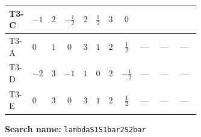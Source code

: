 \documentclass[8pt]{article}
\begin{document}
\begin{landscape}
\begin{longtable}{@{}llcccccc >{\raggedright\arraybackslash}p{0.21\linewidth} >{\raggedright\arraybackslash}p{0.21\linewidth} >{\raggedright\arraybackslash}p{0.21\linewidth}@{}}
T3-C & $-1$ & $2$ & $-\frac{1}{2}$ & $2$ & $\frac{1}{2}$ & $3$ & $0$ & \scriptsize\adjustbox{max width=\linewidth}{$\begin{gathered} 4 {\lambda_{S_1^{\dagger 2}S_2^{\dagger 2}}} (\left({\lambda_{S_1^\dagger S_2 S_2^{\dagger 2}}}\right)^{*}+5 \left({\lambda_{S_1 S_1^{\dagger 2}S_2^\dagger}}\right)^{*})\end{gathered}$} & \scriptsize\adjustbox{max width=\linewidth}{$\begin{gathered} -9 {g_2}^2 {\lambda_{S_1 S_1^{\dagger 2}S_2^\dagger}}\end{gathered}$} & \scriptsize\adjustbox{max width=\linewidth}{$\begin{gathered} -3 {g_Y}^2 {\lambda_{S_1 S_1^{\dagger 2}S_2^\dagger}}\end{gathered}$} \\
\midrule
T3-A & $0$ & $1$ & $0$ & $3$ & $1$ & $2$ & $\frac{1}{2}$ & --- & --- & --- \\
\midrule
T3-D & $-2$ & $3$ & $-1$ & $1$ & $0$ & $2$ & $-\frac{1}{2}$ & --- & --- & --- \\
\midrule
T3-E & $0$ & $3$ & $0$ & $3$ & $1$ & $2$ & $\frac{1}{2}$ & --- & --- & --- \\
\midrule
\bottomrule
\end{longtable}
\clearpage
\noindent\textbf{Search name: }\texttt{lambdaS1S1bar2S2bar}\par\smallskip

\end{landscape}
\end{document}
